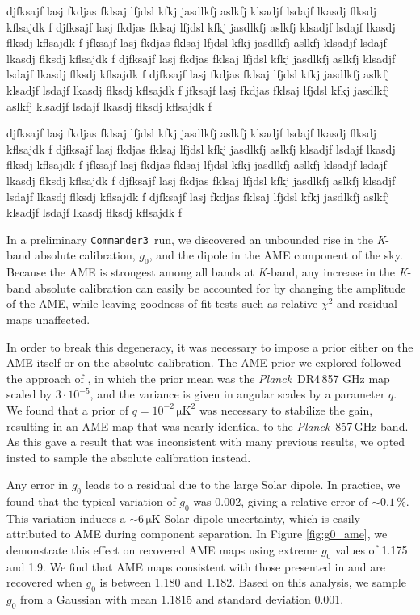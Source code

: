 \documentclass[twocolumn]{../../common/aa}
\def\Planck{\emph{Planck}}
\def\commanderthree{\texttt{Commander3}}
\newcommand{\K}[0]{\textit K}
\begin{document}
djfksajf lasj fkdjas fklsaj lfjdsl kfkj jasdlkfj aslkfj klsadjf lsdajf lkasdj flksdj kflsajdk f
djfksajf lasj fkdjas fklsaj lfjdsl kfkj jasdlkfj aslkfj klsadjf lsdajf lkasdj flksdj kflsajdk f
jfksajf lasj fkdjas fklsaj lfjdsl kfkj jasdlkfj aslkfj klsadjf lsdajf lkasdj flksdj kflsajdk f
djfksajf lasj fkdjas fklsaj lfjdsl kfkj jasdlkfj aslkfj klsadjf lsdajf lkasdj flksdj kflsajdk f
djfksajf lasj fkdjas fklsaj lfjdsl kfkj jasdlkfj aslkfj klsadjf lsdajf lkasdj flksdj kflsajdk f
jfksajf lasj fkdjas fklsaj lfjdsl kfkj jasdlkfj aslkfj klsadjf lsdajf lkasdj flksdj kflsajdk f

djfksajf lasj fkdjas fklsaj lfjdsl kfkj jasdlkfj aslkfj klsadjf lsdajf lkasdj flksdj kflsajdk f
djfksajf lasj fkdjas fklsaj lfjdsl kfkj jasdlkfj aslkfj klsadjf lsdajf lkasdj flksdj kflsajdk f
jfksajf lasj fkdjas fklsaj lfjdsl kfkj jasdlkfj aslkfj klsadjf lsdajf lkasdj flksdj kflsajdk f
djfksajf lasj fkdjas fklsaj lfjdsl kfkj jasdlkfj aslkfj klsadjf lsdajf lkasdj flksdj kflsajdk f
djfksajf lasj fkdjas fklsaj lfjdsl kfkj jasdlkfj aslkfj klsadjf lsdajf lkasdj flksdj kflsajdk f


In a preliminary \commanderthree\ run, we discovered an unbounded rise in the
\K-band absolute calibration, $g_0$, and the dipole in the AME component of the sky. Because the AME is strongest among all bands at \K-band, any increase in the \K-band absolute calibration can easily be accounted for by changing the amplitude of the AME, while leaving goodness-of-fit tests such as relative-$\chi^2$ and residual maps unaffected.

In order to break this degeneracy, it was necessary to impose a prior either on the AME itself or on the absolute calibration. The AME prior we explored followed the approach of \citet{bp13}, in which the prior mean was the \Planck\ DR4\,857 GHz map scaled by $3\cdot10^{-5}$, and the variance is given in angular scales by a parameter $q$. We found that a prior of $q=10^{-2}\,\mathrm{\mu K}^2$ was necessary to stabilize the gain, resulting in an AME map that was nearly identical to the \Planck\ 857\,GHz band. As this gave a result that was inconsistent with many previous results, we opted insted to sample the absolute calibration instead.

Any error in $g_0$ leads to a residual due to the large Solar dipole. In practice, we found that the typical variation of $g_0$ was 0.002, giving a relative error of $\sim0.1\,\%$. This variation induces a $\sim6\,\mathrm{\mu K}$ Solar dipole uncertainty, which is easily attributed to AME during component separation. In Figure \ref{fig:g0_ame}, we demonstrate this effect on recovered AME maps using extreme $g_0$ values of 1.175 and 1.9. We find that AME maps consistent with those presented in \citet{bennett2012} and \citet{planck2014-a12} are recovered when $g_0$ is between 1.180 and 1.182. Based on this analysis, we sample $g_0$ from a Gaussian with mean 1.1815 and standard deviation 0.001.
\end{document}
